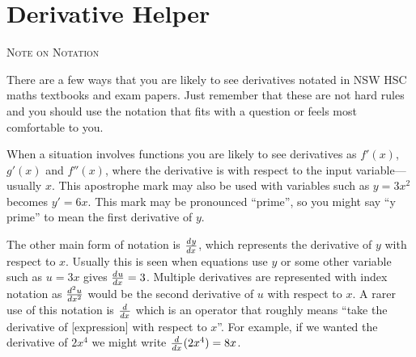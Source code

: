 \documentclass[a4paper,10pt]{article}
\newcommand{\deriv}[3][ ]{\ensuremath\frac{d^{#1}#2}{d#3^{#1}}}
\newcommand{\derivof}[2][ ]{\ensuremath\frac{d^{#1}}{d#2^{#1}}}
\begin{document}
\section*{Derivative Helper}

\begin{multicols*}{2}

{\large\textsc{Note on Notation}}

There are a few ways that you are likely to see derivatives notated in NSW HSC maths 
textbooks and exam papers. Just remember that these are not hard rules and you should 
use the notation that fits with a question or feels most comfortable to you.

When a situation involves functions you are likely to see derivatives as 
$f'(x)$, $g'(x)$ and $f''(x)$, where the derivative is with respect to the input 
variable---usually $x$. This apostrophe mark may also be used with variables 
such as $y = 3x^2$ becomes $y' = 6x$. This mark may be pronounced ``prime'', 
so you might say ``y prime'' to mean the first derivative of $y$.

The other main form of notation is $\deriv{y}{x}$, which represents the derivative 
of $y$ with respect to $x$. Usually this is seen when equations use $y$ or some 
other variable such as $u = 3x$ gives $\deriv{u}{x} = 3$. Multiple derivatives are 
represented with index notation as $\deriv[2]{u}{x}$ would be the second derivative of 
$u$ with respect to $x$. A rarer use of this notation is $\derivof{x}$ which is an 
operator that roughly means ``take the derivative of [expression] with respect to $x$''.
For example, if we wanted the derivative of $2x^4$ we might write $\derivof{x}(2x^4) = 8x$.


\end{multicols*}
\end{document}
